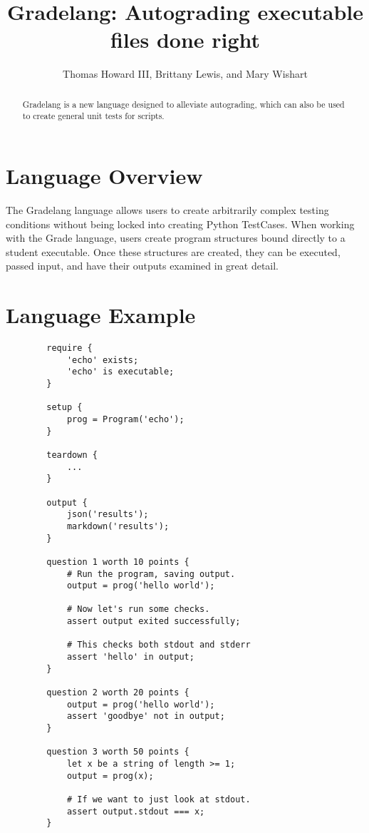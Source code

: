 \documentclass{article}
\title{Gradelang: Autograding executable files done right}
\author{Thomas Howard III, Brittany Lewis, and Mary Wishart}
\begin{document}
    \maketitle

    \begin{abstract}
        Gradelang is a new language designed to alleviate autograding, which can also be used to create general unit tests for scripts.
    \end{abstract}
    
    \section{Language Overview}
    The Gradelang language allows users to create arbitrarily complex testing conditions without being locked into creating Python TestCases.
    When working with the Grade language, users create program structures bound directly to a student executable.
    Once these structures are created, they can be executed, passed input, and have their outputs examined in great detail.
    
      
    \newpage
    \section{Language Example}
    \begin{lstlisting}
        require {
            'echo' exists;
            'echo' is executable;
        }

        setup {
            prog = Program('echo');
        }

        teardown {
            ...
        }

        output {
            json('results');
            markdown('results');
        }

        question 1 worth 10 points {
            # Run the program, saving output.
            output = prog('hello world');

            # Now let's run some checks.
            assert output exited successfully;
            
            # This checks both stdout and stderr
            assert 'hello' in output;
        }

        question 2 worth 20 points {
            output = prog('hello world');
            assert 'goodbye' not in output;
        }

        question 3 worth 50 points {
            let x be a string of length >= 1;
            output = prog(x);

            # If we want to just look at stdout.
            assert output.stdout === x;
        }
    \end{lstlisting}
\end{document}
